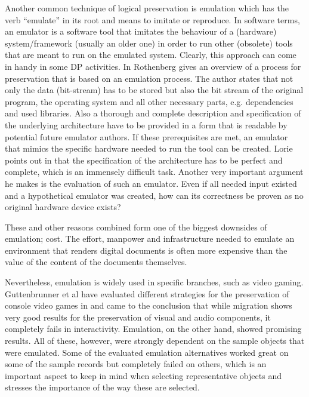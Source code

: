 Another common technique of logical preservation is emulation which has the verb ``emulate'' in its root and means to imitate or reproduce.
In software terms, an emulator is a software tool that imitates the behaviour of a (hardware) system/framework (usually an older one) in order to run other (obsolete) tools that are meant to run on the emulated system. Clearly, this approach can come in handy in some DP activities.
In \cite{rothenberg:1999:ensuring} Rothenberg gives an overview of a process for preservation that is based on an emulation process. The author states that not only the data (bit-stream) has to be stored but also the bit stream of the original program, the operating system and all other necessary parts, e.g. dependencies and used libraries. Also a thorough and complete description and specification of the underlying architecture have to be provided in a form that is readable by potential future emulator authors. If these prerequisites are met, an emulator that mimics the specific hardware needed to run the tool can be created.
Lorie points out in \cite{Lorie:2001:LTP:379437.379726} that the specification of the architecture has to be perfect and complete, which is an immensely difficult task. Another very important argument he makes is the evaluation of such an emulator. Even if all needed input existed and a hypothetical emulator was created, how can its correctness be proven as no original hardware device exists?

These and other reasons combined form one of the biggest downsides of emulation; cost. The effort, manpower and infrastructure needed to emulate an environment that renders digital documents is often more expensive than the value of the content of the documents themselves.

Nevertheless, emulation is widely used in specific branches, such as video gaming.
Guttenbrunner et al have evaluated different strategies for the preservation of console video games in \cite{guttenbrunner:2008:evaluating} and came to the conclusion that while migration shows very good results for the preservation of visual and audio components, it completely fails in interactivity. Emulation, on the other hand, showed promising results. All of these, however, were strongly dependent on the sample objects that were emulated. Some of the evaluated emulation alternatives worked great on some of the sample records but completely failed on others, which is an important aspect to keep in mind when selecting representative objects and stresses the importance of the way these are selected.

